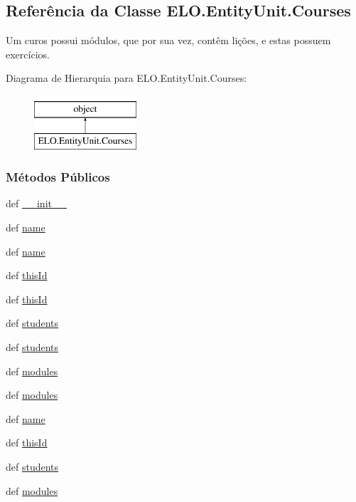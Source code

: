 \hypertarget{classELO_1_1EntityUnit_1_1Courses}{\subsection{Referência da Classe E\-L\-O.\-Entity\-Unit.\-Courses}
\label{classELO_1_1EntityUnit_1_1Courses}
}


Um curos possui módulos, que por sua vez, contêm lições, e estas possuem exercícios.  


Diagrama de Hierarquia para E\-L\-O.\-Entity\-Unit.\-Courses\-:\begin{figure}[H]
\begin{center}
\leavevmode
\includegraphics[height=2.000000cm]{d2/dc4/classELO_1_1EntityUnit_1_1Courses}
\end{center}
\end{figure}
\subsubsection*{Métodos Públicos}
\begin{DoxyCompactItemize}
\item 
def \hyperlink{classELO_1_1EntityUnit_1_1Courses_a8e8a964217e8e2b76c3ebd889ed8ae1e}{\-\_\-\-\_\-init\-\_\-\-\_\-}
\item 
def \hyperlink{classELO_1_1EntityUnit_1_1Courses_a7b502c0d94108e3c474e5a0e2842cc1d}{name}
\item 
def \hyperlink{classELO_1_1EntityUnit_1_1Courses_a7b502c0d94108e3c474e5a0e2842cc1d}{name}
\item 
def \hyperlink{classELO_1_1EntityUnit_1_1Courses_a079f341a80c13005aec8764266f5c2f2}{this\-Id}
\item 
def \hyperlink{classELO_1_1EntityUnit_1_1Courses_a079f341a80c13005aec8764266f5c2f2}{this\-Id}
\item 
def \hyperlink{classELO_1_1EntityUnit_1_1Courses_ab1a0895decc2986339e0ab148922ad61}{students}
\item 
def \hyperlink{classELO_1_1EntityUnit_1_1Courses_ab1a0895decc2986339e0ab148922ad61}{students}
\item 
def \hyperlink{classELO_1_1EntityUnit_1_1Courses_a5d791876c321c20f5a698273613d0d01}{modules}
\item 
def \hyperlink{classELO_1_1EntityUnit_1_1Courses_a5d791876c321c20f5a698273613d0d01}{modules}
\item 
def \hyperlink{classELO_1_1EntityUnit_1_1Courses_a7b502c0d94108e3c474e5a0e2842cc1d}{name}
\item 
def \hyperlink{classELO_1_1EntityUnit_1_1Courses_a079f341a80c13005aec8764266f5c2f2}{this\-Id}
\item 
def \hyperlink{classELO_1_1EntityUnit_1_1Courses_ab1a0895decc2986339e0ab148922ad61}{students}
\item 
def \hyperlink{classELO_1_1EntityUnit_1_1Courses_a5d791876c321c20f5a698273613d0d01}{modules}
\end{DoxyCompactItemize}
